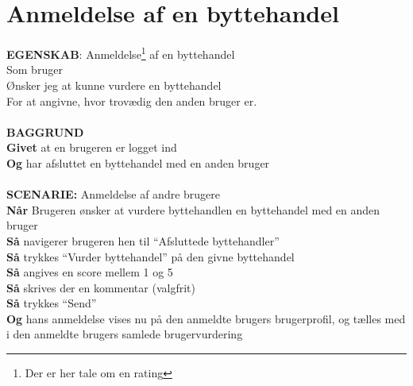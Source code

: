 \section{Anmeldelse af en byttehandel}
{\color{blue}\textbf{EGENSKAB}:} Anmeldelse\footnote{Der er her tale om en rating} af en byttehandel \\
Som bruger \\
Ønsker jeg at kunne vurdere en byttehandel \\
For at angivne, hvor trovædig den anden bruger er.\\ \\
{\color{blue}\textbf{BAGGRUND}} \\
{\color{blue}\textbf{Givet}} at en brugeren er logget ind \\
{\color{blue}\textbf{Og}} har afsluttet en byttehandel med en anden bruger\\\\
{\color{blue}\textbf{SCENARIE:}} Anmeldelse af andre brugere \\
{\color{blue}\textbf{Når}} Brugeren ønsker at vurdere byttehandlen en byttehandel med en anden bruger\\
{\color{blue}\textbf{Så}} navigerer brugeren hen til “Afsluttede byttehandler”\\
{\color{blue}\textbf{Så}} trykkes “Vurder byttehandel” på den givne byttehandel\\
{\color{blue}\textbf{Så}} angives en score mellem 1 og 5\\
{\color{blue}\textbf{Så}} skrives der en kommentar (valgfrit)\\
{\color{blue}\textbf{Så}} trykkes “Send”\\
{\color{blue}\textbf{Og}} hans anmeldelse vises nu på den anmeldte brugers brugerprofil, og tælles med i den anmeldte brugers samlede brugervurdering
